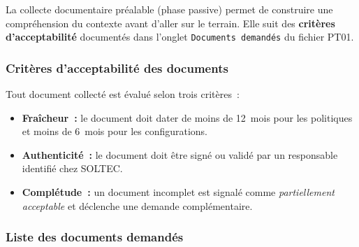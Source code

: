 \documentclass[12pt,a4paper,oneside]{report}
\begin{document}
La collecte documentaire pr\'ealable (phase passive) permet de construire une
compr\'ehension du contexte avant d'aller sur le terrain. Elle suit des
\textbf{crit\`eres d'acceptabilit\'e} document\'es dans l'onglet
\texttt{Documents demandés} du fichier PT01.

\subsubsection{Crit\`eres d'acceptabilit\'e des documents}

Tout document collect\'e est \'evalu\'e selon trois crit\`eres~:

\begin{itemize}[label={\color{gold}}, leftmargin=*, itemsep=2pt]
\item \textbf{Fra\^icheur~:} le document doit dater de moins de 12~mois pour
  les politiques et moins de 6~mois pour les configurations.
\item \textbf{Authenticit\'e~:} le document doit \^etre sign\'e ou valid\'e
  par un responsable identifi\'e chez SOLTEC.
\item \textbf{Compl\'etude~:} un document incomplet est signal\'e comme
  \textit{partiellement acceptable} et d\'eclenche une demande compl\'ementaire.
\end{itemize}

\subsubsection{Liste des documents demand\'es}
\end{document}
